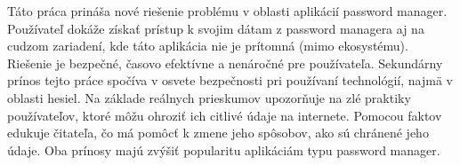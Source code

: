 Táto práca prináša nové riešenie problému v oblasti aplikácií password manager. Používateľ dokáže získať prístup k svojim dátam z password managera aj na cudzom zariadení, kde táto aplikácia nie je prítomná (mimo ekosystému). Riešenie je bezpečné, časovo efektívne a nenáročné pre používateľa. Sekundárny prínos tejto práce spočíva v osvete bezpečnosti pri používaní technológií, najmä v oblasti hesiel. Na základe reálnych prieskumov upozorňuje na zlé praktiky používateľov, ktoré môžu ohroziť ich citlivé údaje na internete. Pomocou faktov edukuje čitateľa, čo má pomôcť k zmene jeho spôsobov, ako sú chránené jeho údaje. Oba prínosy majú zvýšiť popularitu aplikáciám typu password manager.